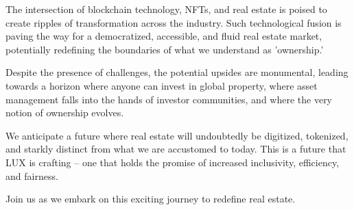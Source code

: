 \documentclass[11pt]{article}
\begin{document}
The intersection of blockchain technology, NFTs, and real estate is poised to create ripples of transformation across the industry. Such technological fusion is paving the way for a democratized, accessible, and fluid real estate market, potentially redefining the boundaries of what we understand as 'ownership.'


Despite the presence of challenges, the potential upsides are monumental, leading towards a horizon where anyone can invest in global property, where asset management falls into the hands of investor communities, and where the very notion of ownership evolves.


We anticipate a future where real estate will undoubtedly be digitized, tokenized, and starkly distinct from what we are accustomed to today. This is a future that LUX is crafting -- one that holds the promise of increased inclusivity, efficiency, and fairness.


Join us as we embark on this exciting journey to redefine real estate.
\end{document}

